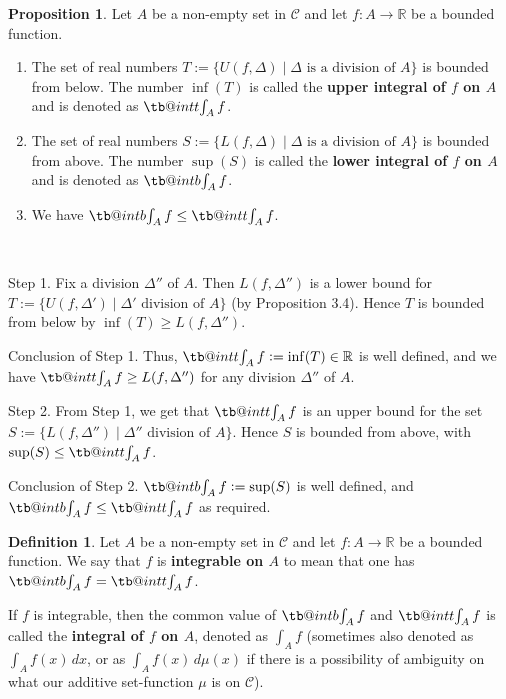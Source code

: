 \documentclass[11pt]{article}
\makeatletter
\theoremstyle{definition}
\newtheorem{defn}[thm]{Definition}
\newtheorem{prop}[thm]{Proposition}
\newcommand{\R}{\ensuremath{\mathbb{R}}}
\newcommand\tint{\mathop{\mathpalette\tb@int{t}}\!\int}
\newcommand\bint{\mathop{\mathpalette\tb@int{b}}\!\int}
\newcommand\tb@int[2]{%
  \sbox\z@{$\m@th#1\int$}%
  \if#2t%
    \rlap{\hbox to\wd\z@{%
      \hfil
      \vrule width .35em height \dimexpr\ht\z@+1.4pt\relax depth -\dimexpr\ht\z@+1pt\relax
      \kern.05em %
    }}
  \else
    \rlap{\hbox to\wd\z@{%
      \vrule width .35em height -\dimexpr\dp\z@+1pt\relax depth \dimexpr\dp\z@+1.4pt\relax
      \hfil
    }}
  \fi
}
\newenvironment{pf}[1][\proofname]{\par
  \pushQED{\qed}%
  \normalfont \topsep0\p@\relax
  \trivlist
  \item[\hskip\labelsep\itshape
  #1\@addpunct{.}]\ignorespaces
}{%
  \popQED\endtrivlist\@endpefalse
}
\makeatother
\begin{document}
\begin{prop}
Let $A$ be a non-empty set in $\mathcal{C}$ and let $f: A \to \R$ be a bounded function. \vspace{-1.5ex}
\begin{enumerate}

    \item The set of real numbers $T := \{U(f, \Delta) \mid \Delta \text{ is a division of } A\}$ is bounded from below. The number $\inf(T)$ is called the {\bf upper integral of $f$ on $A$} and is denoted as $\tint_A f$.
    
    \item The set of real numbers $S := \{L(f, \Delta) \mid \Delta \text{ is a division of } A\}$ is bounded from above. The number $\sup(S)$ is called the {\bf lower integral of $f$ on $A$} and is denoted as $\bint_A f$.
    
    \item We have $\bint_A f \leq \tint_A f$.
    
\end{enumerate}
\end{prop}
\begin{pf}~ 

{\sc Step 1.} Fix a division $\Delta''$ of $A$. Then $L(f, \Delta'')$ is a lower bound for $T := \{U(f, \Delta') \mid \Delta' \text{ division of } A\}$ (by Proposition 3.4). Hence $T$ is bounded from below by $\inf(T) \geq L(f, \Delta'')$.

{\sc Conclusion of Step 1.} Thus, $\tint_A f := \inf(T) \in \R$ is well defined, and we have $\tint_A f \geq L(f, \Delta'')$ for any division $\Delta''$ of $A$.

{\sc Step 2.} From Step 1, we get that $\tint_A f$ is an upper bound for the set $S := \{L(f, \Delta'') \mid \Delta'' \text{ division of } A\}$. Hence $S$ is bounded from above, with $\sup(S) \leq \tint_A f$.

{\sc Conclusion of Step 2.} $\bint_A f := \sup(S)$ is well defined, and $\bint_A f \leq \tint_A f$ as required.
\end{pf}

\begin{defn} 
Let $A$ be a non-empty set in $\mathcal{C}$ and let $f : A \to \R$ be a bounded function. We say that $f$ is {\bf integrable on $A$} to mean that one has $\bint_A f = \tint_A f$. 

If $f$ is integrable, then the common value of $\bint_A f$ and $\tint_A f$ is called the {\bf integral of $f$ on $A$}, denoted as $\int_A f$ (sometimes also denoted as $\int_A f(x)\,dx$, or as $\int_A f(x)\,d\mu(x)$ if there is a possibility of ambiguity on what our additive set-function $\mu$ is on $\mathcal{C}$).
\end{defn}
\end{document}
